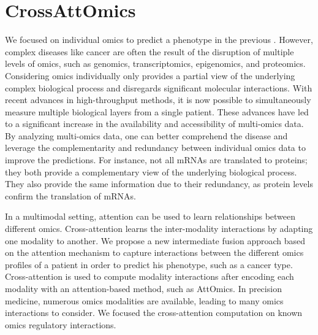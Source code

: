 \documentclass[../main.tex]{subfiles}
\begin{document}
\chapter{CrossAttOmics}\label{chap:crossattomics}
\minitocpage

We focused on individual omics to predict a phenotype in the previous .
However, complex diseases like cancer are often the result of the disruption of multiple levels of omics, such as genomics, transcriptomics, epigenomics, and proteomics.
Considering omics individually only provides a partial view of the underlying complex biological process and disregards significant molecular interactions.
With recent advances in high-throughput methods, it is now possible to simultaneously measure multiple biological layers from a single patient.
These advances have led to a significant increase in the availability and accessibility of multi-omics data.
By analyzing multi-omics data, one can better comprehend the disease and leverage the complementarity and redundancy between individual omics data to improve the predictions.
For instance, not all mRNAs are translated to proteins; they both provide a complementary view of the underlying biological process.
They also provide the same information due to their redundancy, as protein levels confirm the translation of mRNAs.

In a multimodal setting, attention can be used to learn relationships between different omics.
Cross-attention learns the inter-modality interactions by adapting one modality to another.
We propose a new intermediate fusion approach based on the attention mechanism to capture interactions between the different omics profiles of a patient in order to predict his phenotype, such as a cancer type.
Cross-attention is used to compute modality interactions after encoding each modality with an attention-based method, such as AttOmics.
In precision medicine, numerous omics modalities are available, leading to many omics interactions to consider.
We focused the cross-attention computation on known omics regulatory interactions.
\end{document}
